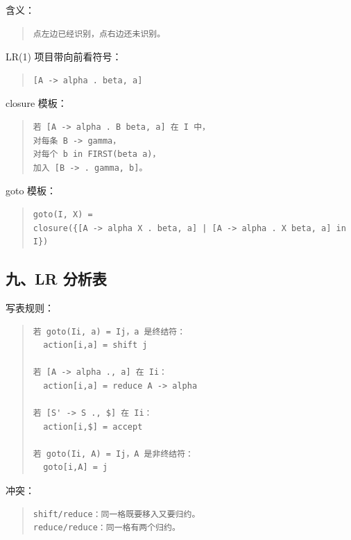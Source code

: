 \documentclass[UTF8,zihao=-4]{ctexart}
\begin{document}
含义：


\begin{quote}
\footnotesize
\begin{verbatim}
点左边已经识别，点右边还未识别。
\end{verbatim}
\end{quote}


LR(1) 项目带向前看符号：


\begin{quote}
\footnotesize
\begin{verbatim}
[A -> alpha . beta, a]
\end{verbatim}
\end{quote}


closure 模板：


\begin{quote}
\footnotesize
\begin{verbatim}
若 [A -> alpha . B beta, a] 在 I 中，
对每条 B -> gamma，
对每个 b in FIRST(beta a)，
加入 [B -> . gamma, b]。
\end{verbatim}
\end{quote}


goto 模板：


\begin{quote}
\footnotesize
\begin{verbatim}
goto(I, X) =
closure({[A -> alpha X . beta, a] | [A -> alpha . X beta, a] in I})
\end{verbatim}
\end{quote}


\subsection{九、LR 分析表}


写表规则：


\begin{quote}
\footnotesize
\begin{verbatim}
若 goto(Ii, a) = Ij，a 是终结符：
  action[i,a] = shift j

若 [A -> alpha ., a] 在 Ii：
  action[i,a] = reduce A -> alpha

若 [S' -> S ., $] 在 Ii：
  action[i,$] = accept

若 goto(Ii, A) = Ij，A 是非终结符：
  goto[i,A] = j
\end{verbatim}
\end{quote}


冲突：


\begin{quote}
\footnotesize
\begin{verbatim}
shift/reduce：同一格既要移入又要归约。
reduce/reduce：同一格有两个归约。
\end{verbatim}
\end{quote}
\end{document}

